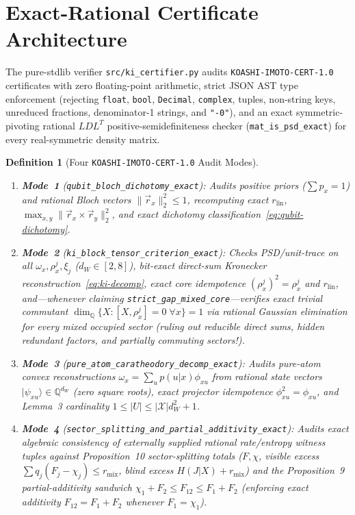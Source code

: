 \documentclass[11pt,twocolumn]{article}
\newtheorem{definition}{Definition}
\newcommand{\QQ}{\mathbb{Q}}
\begin{document}
\section{Exact-Rational Certificate Architecture}\label{sec:certifier}
The pure-stdlib verifier \texttt{src/ki\_certifier.py} audits \texttt{KOASHI-IMOTO-CERT-1.0} certificates with zero floating-point arithmetic, strict JSON AST type enforcement (rejecting \texttt{float}, \texttt{bool}, \texttt{Decimal}, \texttt{complex}, tuples, non-string keys, unreduced fractions, denominator-1 strings, and \texttt{"-0"}), and an exact symmetric-pivoting rational $LDL^T$ positive-semidefiniteness checker (\texttt{mat\_is\_psd\_exact}) for every real-symmetric density matrix.

\begin{definition}[Four \texttt{KOASHI-IMOTO-CERT-1.0} Audit Modes]\label{def:modes}
\leavevmode
\begin{enumerate}[leftmargin=*,nosep]
  \item \textbf{Mode~1} (\texttt{\small qubit\_\allowbreak bloch\_\allowbreak dichotomy\_\allowbreak exact}): Audits positive priors ($\sum p_x = 1$) and rational Bloch vectors $\|\vec{r}_x\|_2^2 \le 1$, recomputing exact $r_{\mathrm{lin}}$, $\max_{x,y}\|\vec{r}_x \times \vec{r}_y\|_2^2$, and exact dichotomy classification~\eqref{eq:qubit-dichotomy}.
  \item \textbf{Mode~2} (\texttt{\small ki\_\allowbreak block\_\allowbreak tensor\_\allowbreak criterion\_\allowbreak exact}): Checks PSD/unit-trace on all $\omega_x, \rho_x^j, \xi_j$ ($d_W \in [2,8]$), bit-exact direct-sum Kronecker reconstruction~\eqref{eq:ki-decomp}, exact core idempotence $(\rho_x^j)^2 = \rho_x^j$ and $r_{\mathrm{lin}}$, and—whenever claiming \texttt{strict\_gap\_mixed\_core}—verifies exact trivial commutant $\dim_\QQ\{X : [X, \rho_x^j]=0\;\forall x\} = 1$ via rational Gaussian elimination for \emph{every} mixed occupied sector (ruling out reducible direct sums, hidden redundant factors, and partially commuting sectors!).
  \item \textbf{Mode~3} (\texttt{\small pure\_\allowbreak atom\_\allowbreak caratheodory\_\allowbreak decomp\_\allowbreak exact}): Audits pure-atom convex reconstructions $\omega_x = \sum_u p(u|x)\phi_{xu}$ from rational state vectors $|\psi_{xu}\rangle \in \QQ^{d_W}$ (zero square roots), exact projector idempotence $\phi_{xu}^2 = \phi_{xu}$, and Lemma~3 cardinality $1 \le |U| \le |\mathcal{X}|d_W^2 + 1$.
  \item \textbf{Mode~4} (\texttt{\small sector\_\allowbreak splitting\_\allowbreak and\_\allowbreak partial\_\allowbreak additivity\_\allowbreak exact}): Audits exact algebraic consistency of externally supplied rational rate/entropy witness tuples against Proposition~10 sector-splitting totals ($F, \chi$, visible excess $\sum q_j(F_j-\chi_j) \le r_{\mathrm{mix}}$, blind excess $H(J|X)+r_{\mathrm{mix}}$) and the Proposition~9 partial-additivity sandwich $\chi_1 + F_2 \le F_{12} \le F_1 + F_2$ (enforcing exact additivity $F_{12} = F_1 + F_2$ whenever $F_1 = \chi_1$).
\end{enumerate}
\end{definition}
\end{document}
